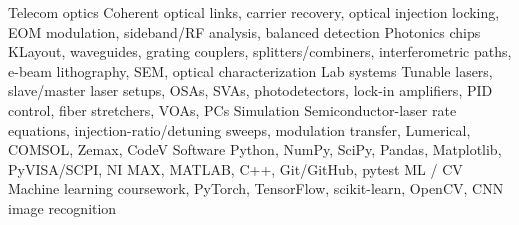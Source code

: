 
\begin{cvskills}
  \cvskill
    {Telecom optics}
    {Coherent optical links, carrier recovery, optical injection locking, EOM modulation, sideband/RF analysis, balanced detection}
  \cvskill
    {Photonics chips}
    {KLayout, waveguides, grating couplers, splitters/combiners, interferometric paths, e-beam lithography, SEM, optical characterization}
  \cvskill
    {Lab systems}
    {Tunable lasers, slave/master laser setups, OSAs, SVAs, photodetectors, lock-in amplifiers, PID control, fiber stretchers, VOAs, PCs}
  \cvskill
    {Simulation}
    {Semiconductor-laser rate equations, injection-ratio/detuning sweeps, modulation transfer, Lumerical, COMSOL, Zemax, CodeV}
  \cvskill
    {Software}
    {Python, NumPy, SciPy, Pandas, Matplotlib, PyVISA/SCPI, NI MAX, MATLAB, C++, Git/GitHub, pytest}
  \cvskill
    {ML / CV}
    {Machine learning coursework, PyTorch, TensorFlow, scikit-learn, OpenCV, CNN image recognition}
\end{cvskills}
